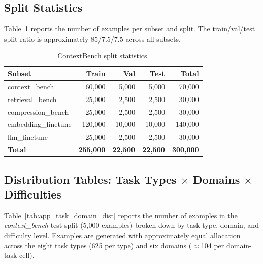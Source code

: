 \subsection{Split Statistics}

Table~\ref{tab:app_split_stats} reports the number of examples per subset and
split.  The train/val/test split ratio is approximately 85/7.5/7.5 across all
subsets.

\begin{table}[h!]
\centering
\caption{ContextBench split statistics.}
\label{tab:app_split_stats}
\begin{tabular}{@{}lrrrr@{}}
\toprule
\textbf{Subset} & \textbf{Train} & \textbf{Val} & \textbf{Test} & \textbf{Total} \\
\midrule
context\_bench      & 60{,}000 &  5{,}000 &  5{,}000 &  70{,}000 \\
retrieval\_bench    & 25{,}000 &  2{,}500 &  2{,}500 &  30{,}000 \\
compression\_bench  & 25{,}000 &  2{,}500 &  2{,}500 &  30{,}000 \\
embedding\_finetune & 120{,}000 & 10{,}000 & 10{,}000 & 140{,}000 \\
llm\_finetune       & 25{,}000 &  2{,}500 &  2{,}500 &  30{,}000 \\
\midrule
\textbf{Total}      & \textbf{255{,}000} & \textbf{22{,}500} & \textbf{22{,}500} & \textbf{300{,}000} \\
\bottomrule
\end{tabular}
\end{table}

\subsection{Distribution Tables: Task Types $\times$ Domains $\times$ Difficulties}

Table~\ref{tab:app_task_domain_dist} reports the number of examples in the
\emph{context\_bench} test split (5{,}000 examples) broken down by task type,
domain, and difficulty level.  Examples are generated with approximately equal
allocation across the eight task types (625 per type) and six domains
($\approx$104 per domain-task cell).

